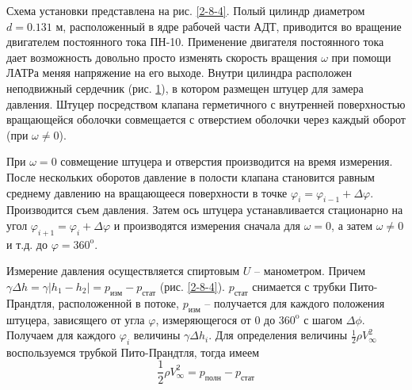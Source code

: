 \documentclass[specialist, subf, href, colorlinks=true, 14pt, final]{disser}
\theoremstyle{definition}
\begin{document}
Схема установки представлена на рис. \ref{2-8-4}. Полый цилиндр диаметром $d = 0.131$ м, расположенный в ядре рабочей части АДТ, приводится во вращение двигателем постоянного тока ПН-10. Применение двигателя постоянного тока дает возможность довольно просто изменять скорость вращения $\omega$ при помощи ЛАТРа меняя напряжение на его выходе. Внутри цилиндра расположен неподвижный сердечник (рис. \ref{2-8-5}), в котором размещен штуцер для замера давления. Штуцер посредством клапана герметичного с внутренней поверхностью вращающейся оболочки совмещается с отверстием оболочки через каждый оборот (при $\omega \neq 0$).
\begin{figure}[!htp]
  \caption{}
  \label{2-8-5}
\end{figure}
При $\omega = 0$ совмещение штуцера и отверстия производится на время измерения. После нескольких оборотов давление в полости клапана становится равным среднему давлению на вращающееся поверхности в точке $\varphi_i = \varphi_{i-1} + \Delta \varphi$. Производится съем давления. Затем ось штуцера устанавливается стационарно на угол $\varphi_{i+1} = \varphi_{i} + \Delta \varphi$ и производятся измерения сначала для $\omega = 0$, а затем $\omega \neq 0$ и т.д. до $\varphi = 360^{\text{o}}$.

Измерение давления осуществляется спиртовым $U$ -- манометром. Причем $\gamma \Delta h = \gamma |h_1 - h_2| = p_{\text{изм}} - p_{\text{стат}} $ (рис. \ref{2-8-4}). $p_{\text{стат}}$ снимается с трубки Пито-Прандтля, расположенной в потоке, $p_{\text{изм}}$ -- получается для каждого положения штуцера, зависящего от угла $\varphi$, измеряющегося от 0 до $360^{\text{o}}$ с шагом $\Delta\phi$. Получаем для каждого $\varphi_i$ величины $\gamma \Delta h_i$. Для определения величины $\frac{1}{2} \rho V^2_{\infty}$ воспользуемся трубкой Пито-Прандтля, тогда имеем
\[ 
\frac{1}{2} \rho V^2_{\infty} = p_{\text{полн}} - p_{\text{стат}} 
\]
\end{document}
